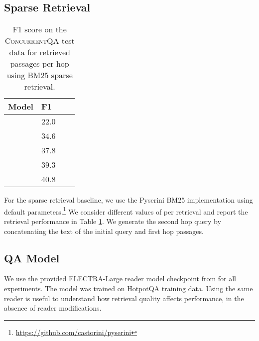 \documentclass{article}
\newcommand{\datasetname}{\textsc{ConcurrentQA}\xspace}
\begin{document}
\subsection{Sparse Retrieval}
\begin{table}[t!]
    \begin{center}
    \normalsize
    \begin{tabular}{llcc}
    \toprule
    Model  &    F1   \\
    \midrule
          &  22.0  \\
          & 34.6  \\
          & 37.8  \\
          & 39.3  \\
         & 40.8  \\
    \bottomrule
    \end{tabular}
    \normalsize
    \caption{F1 score on the \datasetname test data  for  retrieved passages per hop using BM25 sparse retrieval.}
    \vspace{2mm}
    \label{tab:bm25_varyk}
    \end{center}
\end{table}
For the sparse retrieval baseline, we use the Pyserini BM25 implementation using default parameters.\footnote{\url{https://github.com/castorini/pyserini}} We consider different values of  per retrieval and report the retrieval performance in Table \ref{tab:bm25_varyk}. We generate the second hop query by concatenating the text of the initial query and first hop passages.

\subsection{QA Model}
We use the provided ELECTRA-Large reader model checkpoint from \citet{xiong2021mdr} for all experiments. The model was trained on HotpotQA training data. Using the same reader is useful to understand how retrieval quality affects performance, in the absence of reader modifications. 
\end{document}
